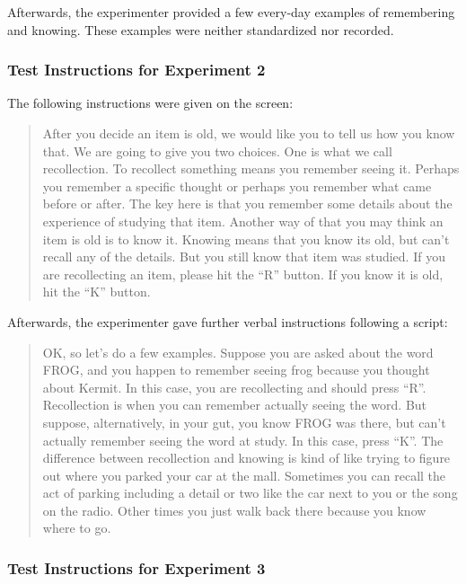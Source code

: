 \documentclass[english,,man]{apa6}
\begin{document}
Afterwards, the experimenter provided a few every-day examples of remembering and knowing. These examples were neither standardized nor recorded.

\hypertarget{test-instructions-for-experiment-2}{%
\subsubsection{Test Instructions for Experiment 2}\label{test-instructions-for-experiment-2}}

The following instructions were given on the screen:

\begin{quote}After you decide an item is old, we would like you to tell us how you know that.
We are going to give you two choices. One is what we call recollection. To recollect
something means you remember seeing it. Perhaps you remember a specific thought
or perhaps you remember what came before or after. The key here is that you
remember some details about the experience of studying that item. Another way of
that you may think an item is old is to know it. Knowing means that you know its
old, but can't recall any of the details. But you still know that item was studied. If
you are recollecting an item, please hit the ``R” button. If you know it is old, hit the
``K” button.
\end{quote}

Afterwards, the experimenter gave further verbal instructions following a script:

\begin{quote}OK, so let's do a few examples. Suppose you are asked about the word FROG,
and you happen to remember seeing frog because you thought about Kermit. In
this case, you are recollecting and should press ``R''. Recollection is when you can
remember actually seeing the word. But suppose, alternatively, in your gut, you
know FROG was there, but can't actually remember seeing the word at study. In
this case, press ``K''. The difference between recollection and knowing is kind of like
trying to figure out where you parked your car at the mall. Sometimes you can recall
the act of parking including a detail or two like the car next to you or the song on
the radio. Other times you just walk back there because you know where to go.
\end{quote}

\hypertarget{test-instructions-for-experiment-3}{%
\subsubsection{Test Instructions for Experiment 3}\label{test-instructions-for-experiment-3}}
\end{document}
